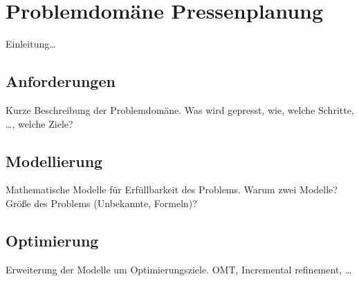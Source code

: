 \chapter{Problemdomäne Pressenplanung}
Einleitung\ldots

\section{Anforderungen}
Kurze Beschreibung der Problemdomäne.
Was wird gepresst, wie, welche Schritte, \ldots, welche Ziele?

\section{Modellierung}
Mathematische Modelle für Erfüllbarkeit des Problems.
Warum zwei Modelle?
Größe des Problems (Unbekannte, Formeln)?

\section{Optimierung}
Erweiterung der Modelle um Optimierungsziele.
OMT, Incremental refinement, \ldots
